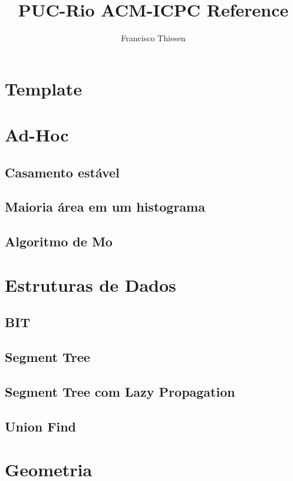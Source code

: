 \documentclass[10pt, letterpaper, twocolumn, twosides]{article}
\begin{document}
\title{PUC-Rio ACM-ICPC Reference}
\author{Francisco Thiesen}
\maketitle
\tableofcontents
{}
\section{Template}


\section{Ad-Hoc}
\subsection{Casamento estável}

\subsection{Maioria área em um histograma}

\subsection{Algoritmo de Mo}


\section{Estruturas de Dados}
\subsection{BIT}

\subsection{Segment Tree}

\subsection{Segment Tree com Lazy Propagation}

\subsection{Union Find}


\section{Geometria}
\end{document}
